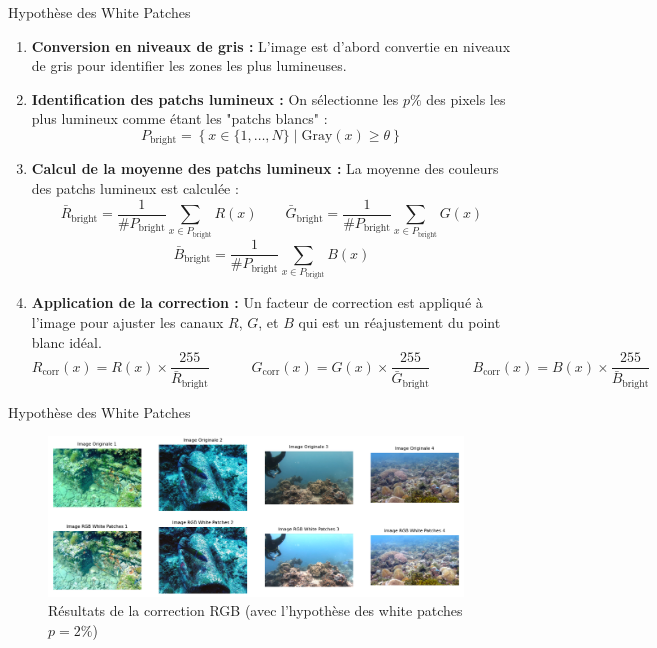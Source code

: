 \documentclass[8pt,a4paper]{beamer}
\numberwithin{figure}{section}
\begin{document}
\begin{frame}{Hypothèse des White Patches}
\begin{enumerate}
    \item \textbf{Conversion en niveaux de gris :} L'image est d'abord convertie en niveaux de gris pour identifier les zones les plus lumineuses.
    
    \item \textbf{Identification des patchs lumineux :} On sélectionne les \( p\% \) des pixels les plus lumineux comme étant les "patchs blancs" :
    \[
P_{\text{bright}} = \left\{ x \in \{1, \dots, N\} \mid \text{Gray}(x) \geq \theta \right\}
\]

    \item \textbf{Calcul de la moyenne des patchs lumineux :} La moyenne des couleurs des patchs lumineux est calculée :
\begingroup
\small   
    $$
    \bar{R}_{\text{bright}} = \frac{1}{\#P_{\text{bright}}} \!\sum_{x\in P_{\text{bright}}}\!\!\!\! R(x) \quad\quad \bar{G}_{\text{bright}} = \frac{1}{\#P_{\text{bright}}}\! \sum_{x\in P_{\text{bright}}} \!\!\!\!G(x) 
    $$
    $$
   \bar{B}_{\text{bright}} = \frac{1}{\#P_{\text{bright}}}\! \sum_{x\in P_{\text{bright}}} \!\!\!\! B(x)
    $$
\endgroup

    \item \textbf{Application de la correction :} Un facteur de correction est appliqué à l'image pour ajuster les canaux \( R \), \( G \), et \( B \) qui est un réajustement du point blanc idéal.
\begingroup
\small   
    $$
    R_{\text{corr}}(x) = R(x) \times \frac{255}{\bar{R}_{\text{bright}}} \quad\quad\quad G_{\text{corr}}(x) = G(x) \times \frac{255}{\bar{G}_{\text{bright}}} \quad\quad\quad B_{\text{corr}}(x) = B(x) \times \frac{255}{\bar{B}_{\text{bright}}}
    $$
\endgroup
\end{enumerate}
\end{frame}

\begin{frame}{Hypothèse des White Patches}
\begin{figure}[h!]
\begin{center}
\includegraphics[width=11cm]{image005.png}
\end{center}
\label{figure2.2}
\caption{Résultats de la correction RGB (avec l'hypothèse des white patches $p=2\%$)}
\end{figure}
\end{frame}
\end{document}
